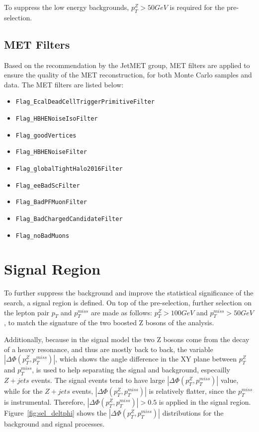 \vspace{0.3cm}
To suppress the low energy backgrounds, $p_T ^Z > 50GeV$ is required for the pre-selection.


\subsection{MET Filters}\label{sec:metfilter}
Based on the recommendation by the JetMET group, MET filters are applied to ensure the quality of the MET reconstruction, for both Monte Carlo samples and data. The MET filters are listed below:
\begin{itemize}
\item \texttt{Flag\_EcalDeadCellTriggerPrimitiveFilter}
\item \texttt{Flag\_HBHENoiseIsoFilter}
\item \texttt{Flag\_goodVertices}
\item \texttt{Flag\_HBHENoiseFilter}
\item \texttt{Flag\_globalTightHalo2016Filter}
\item \texttt{Flag\_eeBadScFilter}
\item \texttt{Flag\_BadPFMuonFilter}
\item \texttt{Flag\_BadChargedCandidateFilter}
\item \texttt{Flag\_noBadMuons}
\end{itemize} 


\section{Signal Region}\label{sec:selection_sr}
To further suppress the background and improve the statistical significance of the search, a signal region is defined. On top of the pre-selection, further selection on the lepton pair $p_T$ and $p_T ^{miss}$ are made as follows: $p_T ^Z > 100GeV$ and $p_T ^{miss} > 50GeV$, to match the signature of the two boosted Z bosons of the analysis. 

\vspace{0.3cm}
Additionally, because in the signal model the two Z bosons come from the decay of a heavy resonance, and thus are mostly back to back, the variable $|\Delta \Phi (p_T ^Z ,p_T ^{miss})|$, which shows the angle difference in the XY plane between $p_T ^Z$ and $p_T ^{miss}$, is used to help separating the signal and background, especailly $Z+jets$ events. The signal events tend to have large $|\Delta \Phi (p_T ^Z ,p_T ^{miss})|$ value, while for the $Z+jets$ events, $|\Delta \Phi (p_T ^Z ,p_T ^{miss})|$ is relatively flatter, since the $p_T ^{miss}$ is instrumental. Therefore, $|\Delta \Phi (p_T ^Z ,p_T ^{miss})|>0.5$ is applied in the signal region. Figure~\ref{fig:sel_deltphi} shows the $|\Delta \Phi (p_T ^Z ,p_T ^{miss})|$ distributions for the background and signal processes.

